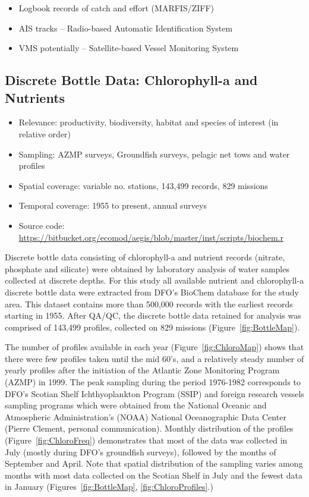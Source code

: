 \documentclass[letterpaper,portrait,11pt]{scrartcl}
\numberwithin{equation}{section}    %
\numberwithin{figure}{section}    %
\numberwithin{table}{section}       %
\begin{document}
\begin{itemize}
	\item Logbook records of catch and effort (MARFIS/ZIFF)
  \item AIS tracks -- Radio-based Automatic Identification System
  \item VMS potentially -- Satellite-based Vessel Monitoring System
\end{itemize}

\subsection{Discrete Bottle Data: Chlorophyll-a and Nutrients}

\begin{itemize}
  \item Relevance: productivity, biodiversity, habitat and species of interest (in relative order)
  \item Sampling: AZMP surveys, Groundfish surveys, pelagic net tows and water profiles
  \item Spatial coverage: variable no. stations, 143,499 records, 829 missions
  \item Temporal coverage: 1955 to present, annual surveys
  \item Source code: \url{https://bitbucket.org/ecomod/aegis/blob/master/inst/scripts/biochem.r}
\end{itemize}

Discrete bottle data consisting of chlorophyll-a and nutrient records (nitrate, phosphate and silicate) were obtained by laboratory analysis of water samples collected at discrete depths. For this study all available nutrient and chlorophyll-a discrete bottle data were extracted from DFO's BioChem database for the study area. This dataset contains more than 500,000 records with the earliest records starting in 1955. After QA/QC, the discrete bottle data retained for analysis was comprised of 143,499 profiles, collected on 829 missions (Figure~\ref{fig:BottleMap}).

The number of profiles available in each year (Figure~\ref{fig:ChloroMap}) shows that there were few profiles taken until the mid 60's, and a relatively steady number of yearly profiles after the initiation of the Atlantic Zone Monitoring Program (AZMP) in 1999. The peak sampling during the period 1976-1982 corresponds to DFO's Scotian Shelf Ichthyoplankton Program (SSIP) and foreign research vessels sampling programs which were obtained from the National Oceanic and Atmospheric Administration's (NOAA) National Oceanographic Data Center (Pierre Clement, personal communication).  Monthly distribution of the profiles (Figure~\ref{fig:ChloroFreq})  demonstrates that most of the data was collected in July (mostly during DFO's groundfish surveys), followed by the months of September and April. Note that spatial distribution of the sampling varies among months with most data collected on the Scotian Shelf in July and the fewest data in January (Figures~\ref{fig:BottleMap}, \ref{fig:ChloroProfiles}.)
\end{document}
